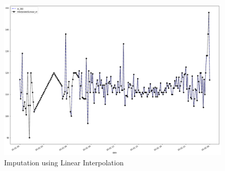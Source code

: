 \begin{figure}[H]
\centering
\includegraphics[scale=.35]{img/linear.png} 
\caption{Imputation using Linear Interpolation }
\label{fig:presteps}
\end{figure}

